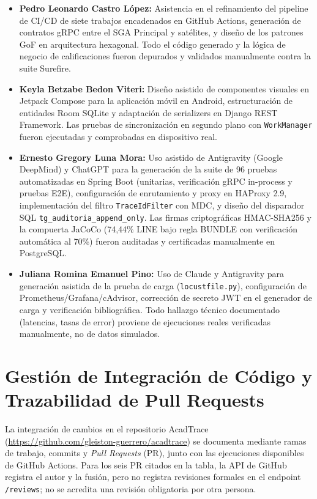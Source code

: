 \documentclass[11pt,a4paper]{article}
\begin{document}
\begin{itemize}[leftmargin=*]
  \item \textbf{Pedro Leonardo Castro L\'opez:} Asistencia en el refinamiento del pipeline de CI/CD de siete trabajos encadenados en GitHub Actions, generaci\'on de contratos gRPC entre el SGA Principal y sat\'elites, y dise\~no de los patrones GoF en arquitectura hexagonal. Todo el c\'odigo generado y la l\'ogica de negocio de calificaciones fueron depurados y validados manualmente contra la suite Surefire.

  \item \textbf{Keyla Betzabe Bedon Viteri:} Dise\~no asistido de componentes visuales en Jetpack Compose para la aplicaci\'on m\'ovil en Android, estructuraci\'on de entidades Room SQLite y adaptaci\'on de serializers en Django REST Framework. Las pruebas de sincronizaci\'on en segundo plano con \texttt{WorkManager} fueron ejecutadas y comprobadas en dispositivo real.

  \item \textbf{Ernesto Gregory Luna Mora:} Uso asistido de Antigravity (Google DeepMind) y ChatGPT para la generaci\'on de la suite de 96 pruebas automatizadas en Spring Boot (unitarias, verificaci\'on gRPC in-process y pruebas E2E), configuraci\'on de enrutamiento y proxy en HAProxy 2.9, implementaci\'on del filtro \texttt{TraceIdFilter} con MDC, y dise\~no del disparador SQL \texttt{tg\_auditoria\_append\_only}. Las firmas criptogr\'aficas HMAC-SHA256 y la compuerta JaCoCo (74,44\% LINE bajo regla BUNDLE con verificaci\'on autom\'atica al 70\%) fueron auditadas y certificadas manualmente en PostgreSQL.

  \item \textbf{Juliana Romina Emanuel Pino:} Uso de Claude y Antigravity para generaci\'on asistida de la prueba de carga (\texttt{locustfile.py}), configuraci\'on de Prometheus/Grafana/cAdvisor, correcci\'on de secreto JWT en el generador de carga y verificaci\'on bibliogr\'afica. Todo hallazgo t\'ecnico documentado (latencias, tasas de error) proviene de ejecuciones reales verificadas manualmente, no de datos simulados.
\end{itemize}

\section{Gestión de Integración de Código y Trazabilidad de Pull Requests}
\label{sec:revision-cruzada}
La integración de cambios en el repositorio AcadTrace (\url{https://github.com/gleiston-guerrero/acadtrace}) se documenta mediante ramas de trabajo, commits y \textit{Pull Requests} (PR), junto con las ejecuciones disponibles de GitHub Actions. Para los seis PR citados en la tabla, la API de GitHub registra el autor y la fusión, pero no registra revisiones formales en el endpoint \texttt{/reviews}; no se acredita una revisión obligatoria por otra persona.
\end{document}
